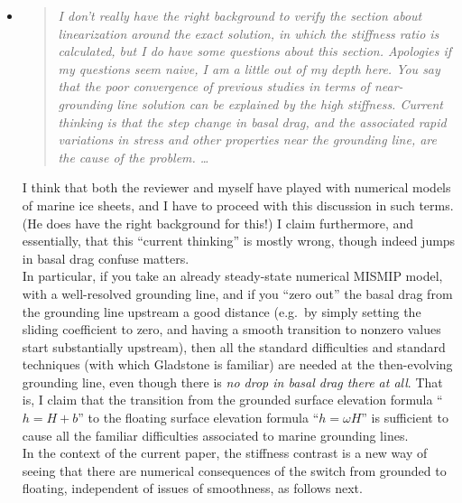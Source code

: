 \documentclass[11pt,reqno]{amsart}
\newcommand{\reply}[2]{
\medskip\medskip
\item  \begin{quote}
\emph{#1}
\end{quote}

\medskip
\noindent #2}
\begin{document}
\begin{itemize}
\reply{I don't really have the right background to verify the section about linearization around the exact solution, in which the stiffness ratio is calculated, but I do have some questions about this section. Apologies if my questions seem naive, I am a little out of my depth here. You say that the poor convergence of previous studies in terms of near-grounding line solution can be explained by the high stiffness. Current thinking is that the step change in basal drag, and the associated rapid variations in stress and other properties near the grounding line, are the cause of the problem.  \dots}
{I think that both the reviewer and myself have played with numerical models of marine ice sheets, and I have to proceed with this discussion in such terms.  (He does have the right background for this!)  I claim furthermore, and essentially, that this ``current thinking'' is mostly wrong, though indeed jumps in basal drag confuse matters.\medskip \\
In particular, if you take an already steady-state numerical MISMIP model, with a well-resolved grounding line, and if you ``zero out'' the basal drag from the grounding line upstream a good distance (e.g.~by simply setting the sliding coefficient to zero, and having a smooth transition to nonzero values start substantially upstream), then all the standard difficulties and standard techniques (with which Gladstone is familiar) are needed at the then-evolving grounding line, even though there is \emph{no drop in basal drag there at all}.  That is, I claim that the transition from the grounded surface elevation formula ``$h=H+b$'' to the floating surface elevation formula ``$h=\omega H$'' is sufficient to cause all the familiar difficulties associated to marine grounding lines. \medskip \\
In the context of the current paper, the stiffness contrast is a new way of seeing that there are numerical consequences of the switch from grounded to floating, independent of issues of smoothness, as follows next.}


\end{itemize}
\end{document}
